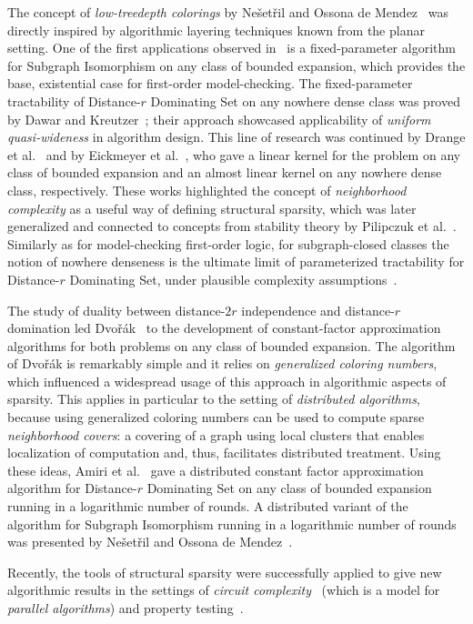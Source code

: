 The concept of {\em{low-treedepth colorings}} by Ne\v{s}et\v{r}il and Ossona de Mendez~\cite{NesetrilM08a} was directly inspired by algorithmic layering techniques known from the planar setting.
One of the first applications observed in~\cite{NesetrilM08a} is a fixed-parameter algorithm for Subgraph Isomorphism on any class of bounded expansion, 
which provides the base, existential case for first-order model-checking. 
The fixed-parameter tractability of Distance-$r$ Dominating Set on any nowhere dense class was proved by Dawar and Kreutzer~\cite{DawarK09}; 
their approach showcased applicability of {\em{uniform quasi-wideness}} in algorithm design.
This line of research was continued by Drange et al.~\cite{DrangeDFKLPPRVS16} and by Eickmeyer et al.~\cite{eickmeyer2016neighborhood}, who gave a linear kernel for the problem on any class of bounded expansion
and an almost linear kernel on any nowhere dense class, respectively.
These works highlighted the concept of {\em{neighborhood complexity}} as a useful way of defining structural sparsity, 
which was later generalized and connected to concepts from stability theory by Pilipczuk et al.~\cite{pilipczuk2018number}.
Similarly as for model-checking first-order logic, for subgraph-closed classes the notion of nowhere denseness is the ultimate limit of parameterized tractability for Distance-$r$ Dominating Set,
under plausible complexity assumptions~\cite{DrangeDFKLPPRVS16}.

The study of duality between distance-$2r$ independence and distance-$r$ domination led Dvo\v{r}\'ak~\cite{Dvorak13}
to the development of constant-factor approximation algorithms for both problems on any class of bounded expansion.
The algorithm of Dvo\v{r}\'ak is remarkably simple and it relies on {\em{generalized coloring numbers}}, which influenced a widespread usage of this approach in algorithmic aspects of sparsity.
This applies in particular to the setting of {\em{distributed algorithms}}, because using generalized coloring numbers can be used to compute sparse {\em{neighborhood covers}}: 
a covering of a graph using local clusters that enables localization of computation and, thus, facilitates distributed treatment.
Using these ideas, Amiri et al.~\cite{AmiriMRS18} gave a distributed constant factor approximation algorithm for Distance-$r$ Dominating Set on any class of bounded expansion running in a logarithmic number of rounds.
A distributed variant of the algorithm for Subgraph Isomorphism running in a logarithmic number of rounds was presented by Ne\v{s}et\v{r}il and Ossona de Mendez~\cite{NesetrilM16}.


Recently, the tools of structural sparsity were successfully applied to give new algorithmic results in the settings of {\em{circuit complexity}}~\cite{PilipczukST18} 
(which is a model for {\em{parallel algorithms}}) and property testing~\cite{AdlerH18}.


